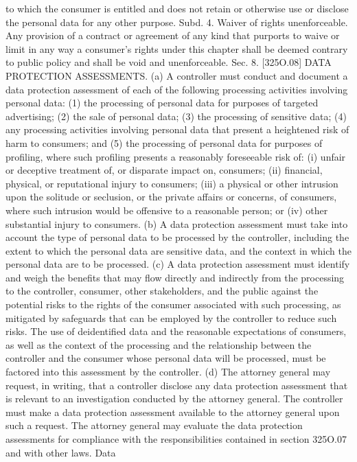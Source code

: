 to which the consumer is entitled and does not retain or otherwise use or disclose the personal
data for any other purpose.
Subd. 4. Waiver of rights unenforceable. Any provision of a contract or agreement of
any kind that purports to waive or limit in any way a consumer's rights under this chapter
shall be deemed contrary to public policy and shall be void and unenforceable.
Sec. 8. [325O.08] DATA PROTECTION ASSESSMENTS.
(a) A controller must conduct and document a data protection assessment of each of the
following processing activities involving personal data:
(1) the processing of personal data for purposes of targeted advertising;
(2) the sale of personal data;
(3) the processing of sensitive data;
(4) any processing activities involving personal data that present a heightened risk of
harm to consumers; and
(5) the processing of personal data for purposes of profiling, where such profiling presents
a reasonably foreseeable risk of:
(i) unfair or deceptive treatment of, or disparate impact on, consumers;
(ii) financial, physical, or reputational injury to consumers;
(iii) a physical or other intrusion upon the solitude or seclusion, or the private affairs or
concerns, of consumers, where such intrusion would be offensive to a reasonable person;
or
(iv) other substantial injury to consumers.
(b) A data protection assessment must take into account the type of personal data to be
processed by the controller, including the extent to which the personal data are sensitive
data, and the context in which the personal data are to be processed.
(c) A data protection assessment must identify and weigh the benefits that may flow
directly and indirectly from the processing to the controller, consumer, other stakeholders,
and the public against the potential risks to the rights of the consumer associated with such
processing, as mitigated by safeguards that can be employed by the controller to reduce
such risks. The use of deidentified data and the reasonable expectations of consumers, as
well as the context of the processing and the relationship between the controller and the
consumer whose personal data will be processed, must be factored into this assessment by
the controller.
(d) The attorney general may request, in writing, that a controller disclose any data
protection assessment that is relevant to an investigation conducted by the attorney general.
The controller must make a data protection assessment available to the attorney general
upon such a request. The attorney general may evaluate the data protection assessments for
compliance with the responsibilities contained in section 325O.07 and with other laws. Data
